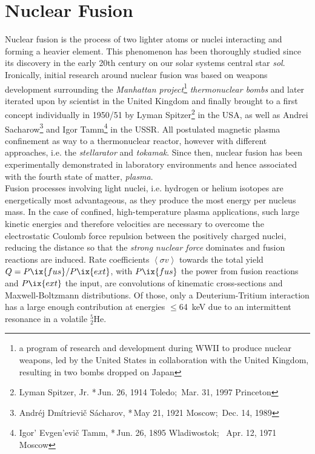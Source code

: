     \section{Nuclear Fusion}\label{sec:section}%
%
        Nuclear fusion is the process of two lighter atoms or nuclei interacting and forming a heavier element. This phenomenon has been thoroughly studied since its discovery in the early 20th century on our solar systems central star \textit{sol}\cite{Oliphant1934}. Ironically, initial research around nuclear fusion was based on weapons development surrounding the \textit{Manhattan project}\footnote[1]{a program of research and development during WWII to produce nuclear weapons, led by the United States in collaboration with the United Kingdom, resulting in two bombs dropped on Japan} \textit{thermonuclear bombs} and later iterated upon by scientist in the United Kingdom and finally brought to a first concept individually in 1950/51 by Lyman Spitzer\footnote[2]{Lyman Spitzer, Jr. *\,Jun. 26, 1914 Toledo; \textdagger\,Mar. 31, 1997 Princeton} in the USA, as well as Andrei Sacharow\footnote[3]{Andréj Dmítrievič Sácharov, *\,May 21, 1921 Moscow; \textdagger\,Dec. 14, 1989} and Igor Tamm\footnote[4]{Igor' Evgen'evič Tamm, *\,Jun. 26, 1895 Wladiwostok; \textdagger\, Apr. 12, 1971 Moscow} in the USSR. All postulated magnetic plasma confinement as way to a thermonuclear reactor, however with different approaches, i.e. the \textit{stellarator} and \textit{tokamak}. Since then, nuclear fusion has been experimentally demonstrated in laboratory environments and hence associated with the fourth state of matter, \textit{plasma}\cite{Shafranov2001}.\\%
        Fusion processes involving light nuclei, i.e. hydrogen or helium isotopes are energetically most advantageous, as they produce the most energy per nucleus mass. In the case of confined, high-temperature plasma applications, such large kinetic energies and therefore velocities are necessary to overcome the electrostatic Coulomb force repulsion between the positively charged nuclei, reducing the distance so that the \textit{strong nuclear force} dominates and fusion reactions are induced. Rate coefficients $\left\langle\sigma v\right\rangle$ towards the total yield $Q=P\ix{fus}/P\ix{ext}$, with $P\ix{fus}$ the power from fusion reactions and $P\ix{ext}$ the input, are convolutions of kinematic cross-sections and Maxwell-Boltzmann distributions. Of those, only a Deuterium-Tritium interaction has a large enough contribution at energies $\le$\SI{64}{\kilo\electronvolt} due to an intermittent resonance in a volatile $^{5}_{2}$He\cite{Bosch1992}.
